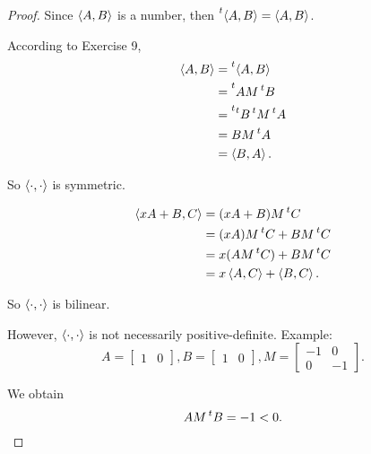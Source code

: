 \begin{proof}
    Since $\left\langle{A, B}\right\rangle$ is a number, then $\prescript{t}{}{\left\langle{A, B}\right\rangle} = \left\langle{A, B}\right\rangle$.

    According to Exercise 9,
    \begin{align*}
        \left\langle{A, B}\right\rangle & = \prescript{t}{}{\left\langle{A, B}\right\rangle}                                    \\
                            & = \prescript{t}{}{AM\prescript{t}{}{B}}                                   \\
                            & = \prescript{t}{}{\prescript{t}{}{B}}\prescript{t}{}{M}\prescript{t}{}{A} \\
                            & = BM\prescript{t}{}{A}                                                    \\
                            & = \left\langle{B, A}\right\rangle.
    \end{align*}

    So $\left\langle{\cdot, \cdot}\right\rangle$ is symmetric.

    \begin{align*}
        \left\langle{xA + B, C}\right\rangle & = (xA + B)M\prescript{t}{}{C}                    \\
                                 & = (xA)M\prescript{t}{}{C} + BM\prescript{t}{}{C} \\
                                 & = x(AM\prescript{t}{}{C}) + BM\prescript{t}{}{C} \\
                                 & = x\left\langle{A, C}\right\rangle + \left\langle{B, C}\right\rangle.
    \end{align*}

    So $\left\langle{\cdot, \cdot}\right\rangle$ is bilinear.

    However, $\left\langle{\cdot, \cdot}\right\rangle$ is not necessarily positive-definite. Example:
    \[
        A = \begin{bmatrix}1 & 0\end{bmatrix}, B = \begin{bmatrix}1 & 0\end{bmatrix}, M = \begin{bmatrix}-1 & 0 \\ 0 & -1\end{bmatrix}.
    \]

    We obtain
    \[
        AM\prescript{t}{}{B} = -1 < 0.
    \]
\end{proof}

